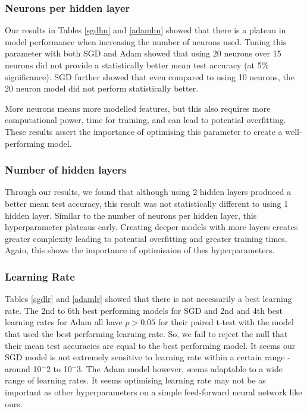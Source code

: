 \documentclass[conference]{IEEEtran}
\begin{document}
\text{}

\subsubsection{Neurons per hidden layer}


Our results in Tables \ref{sgdhn} and \ref{adamhn} showed that there is a plateau in model performance when increasing the number of neurons used. Tuning this parameter with both SGD and Adam showed that using 20 neurons over 15 neurons did not provide a statistically better mean test accuracy (at 5\% significance). SGD further showed that even compared to using 10 neurons, the 20 neuron model did not perform statistically better.

More neurons means more modelled features, but this also requires more computational power, time for training, and can lead to potential overfitting. These results assert the importance of optimising this parameter to create a well-performing model.

\text{}

\subsubsection{Number of hidden layers}
Through our results, we found that although using 2 hidden layers produced a better mean test accuracy, this result was not statistically different to using 1 hidden layer. Similar to the number of neurons per hidden layer, this hyperparameter plateaus early. Creating deeper models with more layers creates greater complexity leading to potential overfitting and greater training times. Again, this shows the importance of optimisaion of thes hyperparameters.

\text{}

\subsubsection{Learning Rate}
Tables \ref{sgdlr} and \ref{adamlr} showed that there is not necessarily a best learning rate. The 2nd to 6th best performing models for SGD and 2nd and 4th best learning rates for Adam all have $p > 0.05$ for their paired t-test with the model that used the best performing learning rate. So, we fail to reject the null that their mean test accuracies are equal to the best performing model. 
It seems our SGD model is not extremely sensitive to learning rate within a certain range - around 10$^-2$ to 10$^-3$. The Adam model however, seems adaptable to a wide range of learning rates. It seems optimising learning rate may not be as important as other hyperparameters on a simple feed-forward neural network like ours.
\end{document}

